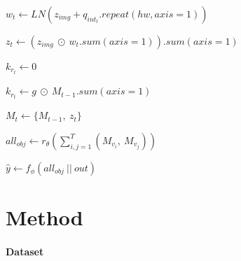 \begin{algorithm}[H]
\begin{algorithmic}
            \State \begin{math} w_t \leftarrow{} LN (z_{img} + q_{int_t}.repeat(hw, axis=1))\end{math}
            
            \State \begin{math} z_t \leftarrow{} (z_{img}~\odot~w_t.sum(axis=1)).sum(axis=1)\end{math}
            
                \State \begin{math} k_{r_{t}} \leftarrow{} 0 \end{math}
            \Else

                \State \begin{math} k_{r_{t}} \leftarrow{} g ~\odot~ M_{t-1}.sum(axis=1) \end{math}
                
            \EndIf
            \State \begin{math} M_{t} \leftarrow{} \{M_{t-1},~ z_{t}\} \end{math}
          \EndFor
    
    \State \begin{math} {all}_{obj} \leftarrow{} r_{{\theta}}(\sum_{i,j=1}^{T} (M_{v_i},~M_{v_j})) \end{math}
    
    \State \begin{math} \hat{y} \leftarrow{} f_{\phi}({all}_{obj}~||~out) \end{math}

\end{algorithmic}
\end{algorithm}

\section{Method}
\label{sec:exp}

\paragraph{Dataset}

